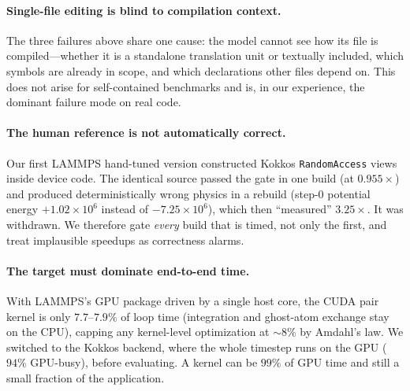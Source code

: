 \paragraph{Single-file editing is blind to compilation context.}
The three failures above share one cause: the model cannot see how its file is compiled---whether it is
a standalone translation unit or textually included, which symbols are already in scope, and which
declarations other files depend on. This does not arise for self-contained benchmarks and is, in our
experience, the dominant failure mode on real code.

\paragraph{The human reference is not automatically correct.}
Our first LAMMPS hand-tuned version constructed Kokkos \texttt{RandomAccess} views inside device code.
The identical source passed the gate in one build (at $0.955\times$) and produced deterministically
wrong physics in a rebuild (step-0 potential energy $+1.02\times10^{6}$ instead of $-7.25\times10^{6}$),
which then ``measured'' $3.25\times$. It was withdrawn. We therefore gate \emph{every} build that is
timed, not only the first, and treat implausible speedups as correctness alarms.

\paragraph{The target must dominate end-to-end time.}
With LAMMPS's GPU package driven by a single host core, the CUDA pair kernel is only $7.7$--$7.9\%$ of
loop time (integration and ghost-atom exchange stay on the CPU), capping any kernel-level optimization
at ${\sim}8\%$ by Amdahl's law. We switched to the Kokkos backend, where the whole timestep runs on the
GPU ($94\%$ GPU-busy), before evaluating. A kernel can be $99\%$ of GPU time and still a small fraction
of the application.

